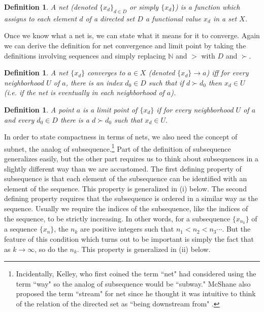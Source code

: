 \documentclass[12pt]{article}
\newtheorem{dfn}[thm]{Definition}
\begin{document}
\begin{dfn}
A net (denoted $\{x_d\}_{d \in D}$  or simply $\{x_d\}$)  is a function which assigns
to each element $d$  of
 a directed set $D$  a functional value $x_d$  in a set $X$.
\end{dfn}

Once we know what a net is, we can state what it means for it to converge. Again we
can derive the definition for net convergence and limit point by taking the
definitions involving sequences and simply replacing $\mathbb{N}$   and $>$ with $D$ and 
$\succ$. 


\begin{dfn}
A net $\{x_d\}$ {\em converges} to $a \in X$  (denoted $\{x_d\} \rightarrow a$) iff for
every neighborhood $U$  of  $a$,
 there is an index $d_0 \in D$  such that if $d \succ d_0$   then $x_d \in U$ (i.e. if
the net is {\em eventually in} each neighborhood of  $a$). 
\end{dfn}

\begin{dfn}
A point $a$ is a {\em limit point} of $\{x_d\}$ if for every neighborhood $U$ of $a$ 
and every $d_0 \in D$ there is a $d \succ d_0$ such that $x_d \in U.$
\end{dfn}

In order to state compactness in terms of nets, we also need the concept of subnet,
the analog of subsequence.\footnote{Incidentally, Kelley, who first coined the term 
``net" had considered using the term ``way" so the analog of subsequence would be
``subway."  McShane also proposed the term ``stream" for net since he thought it was
intuitive to think of the relation of the directed set as ``being downstream from" \cite[p. 282]{mcsh}.}   
Part of the definition of subsequence generalizes easily, but the other part requires 
us to think about subsequences in a slightly different way than we are accustomed. 
The first defining property of subsequence is that each
element of the subsequence can be identified with an element of the sequence. This
property is generalized in (i) below. The second defining property requires that the
subsequence is ordered in a similar way as the sequence. Usually we require the
indices of the subsequence, like the indices of the sequence, to be strictly
increasing. In other words, for a subsequence $\{x_{n_k}\}$  of a sequence $\{x_n\}$,
the $n_k$  are positive integers such that $n_1< n_2<n_3 \cdots$. But the feature of
this condition which turns out to be important is simply the fact that as $k
\rightarrow \infty$, so do the $n_k$. This property is generalized in (ii) below.
\end{document}
